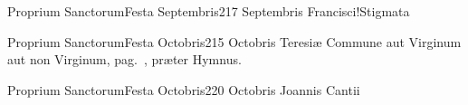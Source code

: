 \documentclass[psalterium-tridentinum.tex]{subfiles}
\begin{document}
\newpage
{}
	{Proprium Sanctorum}{Festa Septembris}{2}{17 Septembris}
	{}{}{Francisci!Stigmata}
	{}
	{}

	{Proprium Sanctorum}{Festa Octobris}{2}{15 Octobris}
	{}{}{Teresiæ}
	{Commune aut Virginum aut non Virginum, pag.\ \pageref{M-MU}, præter Hymnus.}
	{}

	{Proprium Sanctorum}{Festa Octobris}{2}{20 Octobris}
	{}{}{Joannis Cantii}
	{}
	{}
\end{document}
